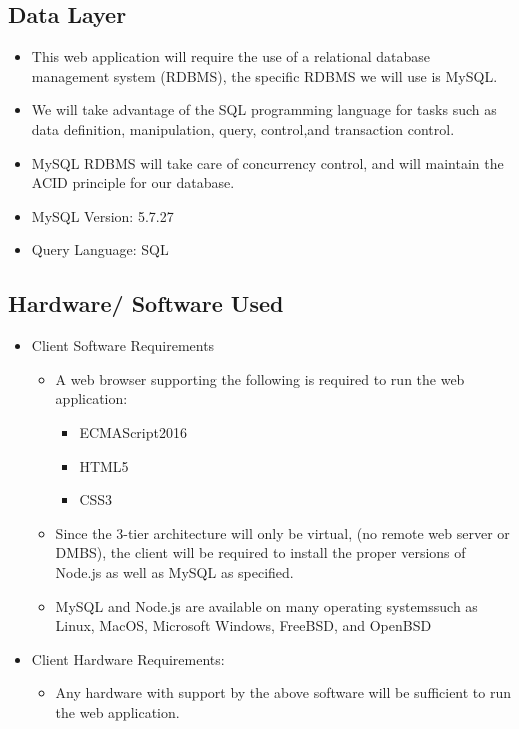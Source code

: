 \documentclass[letter, 12pt, titlepage]{article}
\begin{document}
		\subsection{Data Layer}
		
			\begin{itemize}
			
			\item	This web application will require the use of a relational database management system (RDBMS), the specific RDBMS we will use is  MySQL.
			\item We will take advantage of the SQL programming language for tasks such as data definition, manipulation, query, control,and transaction control.
			\item MySQL RDBMS will take care of concurrency control, and will maintain the ACID principle for our database. 
			\item MySQL Version: 5.7.27
			\item Query Language: SQL
			\end{itemize}
		\subsection{Hardware/ Software Used}
		
		\begin{itemize}

			\item Client Software Requirements
			\begin{itemize}
				\item A web browser supporting the following is required to run the web application:
					\begin{itemize}
						\item ECMAScript2016
						\item HTML5
						\item CSS3
					\end{itemize}
			\item Since the 3-tier architecture will only be virtual, (no remote web server or DMBS), the client will be required to install the proper versions of Node.js as well as MySQL as specified. 
			
			\item  MySQL and Node.js are available on many operating systemssuch as Linux, MacOS, Microsoft Windows, FreeBSD, and OpenBSD	
			\end{itemize}

		\item Client Hardware Requirements:
			\begin{itemize}	
				\item Any hardware with support by the above software will be sufficient to run the web application.
			\end{itemize}
		\end{itemize}
\end{document}
